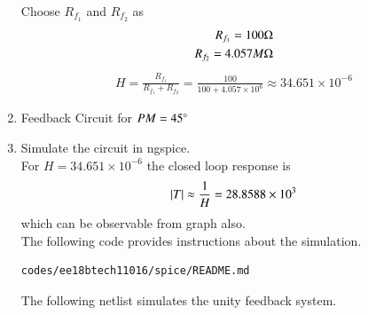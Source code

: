 \begin{enumerate}[label=\arabic*.,ref=\theenumi]
Choose $R_{f_{1}}$ and $R_{f_{2}}$ as
\begin{align}
    R_{f_{1}} = 100\ohm\\
    R_{f_{2}} = 4.057M\ohm
\end{align}
\begin{align}
H = \frac{R_{f_{1}}}{R_{f_{1}}+R_{f_{2}}} = \frac{100}{100+4.057\times10^6} \approx 34.651\times10^{-6}
\end{align}
\item Feedback Circuit for $PM = 45\degree$
\\
\solution
\begin{figure}[ht!]
	\begin{center}
		\resizebox{\columnwidth}{!}{}
	\end{center}
	\caption{}
	\label{fig:ee18btech11016_figc}
\end{figure}

\item Simulate the circuit in ngspice.\\
\solution For $H=34.651\times10^{-6}$ the closed loop response is
\begin{align}
\left\vert T\right\vert \approx \frac{1}{H} = 28.8588\times10^{3}
\end{align}
which can be observable from graph also.
\\

The following code provides instructions about the simulation.
\begin{lstlisting}
codes/ee18btech11016/spice/README.md
\end{lstlisting}


The following netlist simulates the unity feedback system. 
\\


\end{enumerate}
